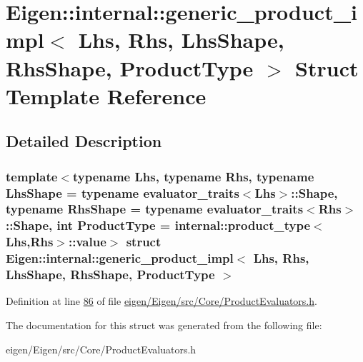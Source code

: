 \hypertarget{struct_eigen_1_1internal_1_1generic__product__impl}{}\section{Eigen\+:\+:internal\+:\+:generic\+\_\+product\+\_\+impl$<$ Lhs, Rhs, Lhs\+Shape, Rhs\+Shape, Product\+Type $>$ Struct Template Reference}
\label{struct_eigen_1_1internal_1_1generic__product__impl}


\subsection{Detailed Description}
\subsubsection*{template$<$typename Lhs, typename Rhs, typename Lhs\+Shape = typename evaluator\+\_\+traits$<$\+Lhs$>$\+::\+Shape, typename Rhs\+Shape = typename evaluator\+\_\+traits$<$\+Rhs$>$\+::\+Shape, int Product\+Type = internal\+::product\+\_\+type$<$\+Lhs,\+Rhs$>$\+::value$>$\newline
struct Eigen\+::internal\+::generic\+\_\+product\+\_\+impl$<$ Lhs, Rhs, Lhs\+Shape, Rhs\+Shape, Product\+Type $>$}



Definition at line \hyperlink{eigen_2_eigen_2src_2_core_2_product_evaluators_8h_source_l00086}{86} of file \hyperlink{eigen_2_eigen_2src_2_core_2_product_evaluators_8h_source}{eigen/\+Eigen/src/\+Core/\+Product\+Evaluators.\+h}.



The documentation for this struct was generated from the following file\+:\begin{DoxyCompactItemize}
\item 
eigen/\+Eigen/src/\+Core/\+Product\+Evaluators.\+h\end{DoxyCompactItemize}
